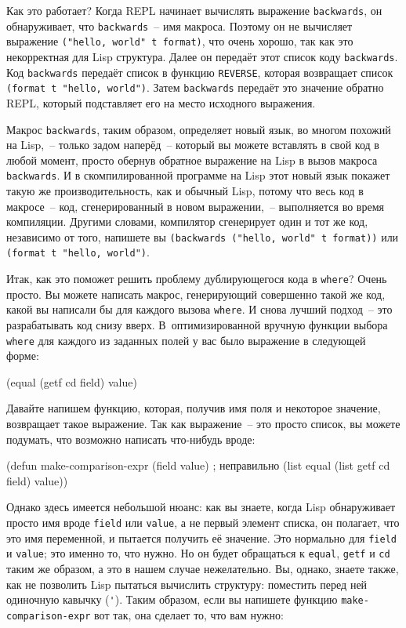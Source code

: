 Как это работает? Когда REPL начинает вычислять выражение \lstinline{backwards}, он
обнаруживает, что \lstinline{backwards}~-- имя макроса. Поэтому он не вычисляет выражение
\lstinline{("hello, world" t format)}, что очень хорошо, так как это некорректная для Lisp
структура. Далее он передаёт этот список коду \lstinline{backwards}. Код \lstinline{backwards}
передаёт список в функцию \lstinline{REVERSE}, которая возвращает список 
\lstinline{(format t "hello, world")}. Затем \lstinline{backwards} передаёт это значение обратно REPL, который
подставляет его на место исходного выражения.

Макрос \lstinline{backwards}, таким образом, определяет новый язык, во многом похожий на
Lisp,~-- только задом наперёд~-- который вы можете вставлять в свой код в любой момент,
просто обернув обратное выражение на Lisp в вызов макроса \lstinline{backwards}. И в
скомпилированной программе на Lisp этот новый язык покажет такую же производительность,
как и обычный Lisp, потому что весь код в макросе~-- код, сгенерированный в новом
выражении,~-- выполняется во время компиляции. Другими словами, компилятор сгенерирует один
и тот же код, независимо от того, напишете вы \lstinline{(backwards ("hello, world" t format))}
или \lstinline{(format t "hello, world")}.

Итак, как это поможет решить проблему дублирующегося кода в \lstinline{where}? Очень прос\-то. Вы
можете написать макрос, генерирующий совершенно такой же код, какой вы написали бы для
каждого вызова \lstinline{where}. И снова лучший подход~-- это разрабатывать код снизу
вверх. В~оптимизированной вручную функции выбора \lstinline{where} для каждого из заданных
полей у вас было выражение в следующей форме:

\begin{myverb}
(equal (getf cd field) value)
\end{myverb}

Давайте напишем функцию, которая, получив имя поля и некоторое значение, возвращает такое
выражение. Так как выражение~-- это просто список, вы можете подумать, что возможно
написать что-нибудь вроде:

\begin{myverb}
(defun make-comparison-expr (field value)    ; неправильно
  (list equal (list getf cd field) value))
\end{myverb}

Однако здесь имеется небольшой нюанс: как вы знаете, когда Lisp обнаруживает просто имя
вроде \lstinline{field} или \lstinline{value}, а не первый элемент списка, он полагает, что это имя
переменной, и пытается получить её значение. Это нормально для \lstinline{field} и
\lstinline{value}; это именно то, что нужно. Но он будет обращаться к \lstinline{equal}, \lstinline{getf}
и \lstinline{cd} таким же образом, а это в нашем случае нежелательно. Вы, однако, знаете также,
как не позволить Lisp пытаться вычислить структуру: поместить перед ней одиночную кавычку
(\lstinline{'}). Таким образом, если вы напишете функцию \lstinline{make-comparison-expr} вот так,
она сделает то, что вам нужно:

